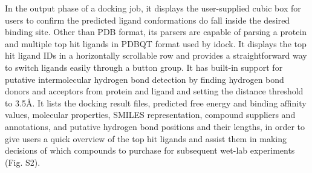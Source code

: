 \documentclass{bioinfo}
\begin{document}
\begin{methods}
In the output phase of a docking job, it displays the user-supplied cubic box for users to confirm the predicted ligand conformations do fall inside the desired binding site. Other than PDB format, its parsers are capable of parsing a protein and multiple top hit ligands in PDBQT format used by idock. It displays the top hit ligand IDs in a horizontally scrollable row and provides a straightforward way to switch ligands easily through a button group. It has built-in support for putative intermolecular hydrogen bond detection by finding hydrogen bond donors and acceptors from protein and ligand and setting the distance threshold to 3.5\AA. It lists the docking result files, predicted free energy and binding affinity values, molecular properties, SMILES representation, compound suppliers and annotations, and putative hydrogen bond positions and their lengths, in order to give users a quick overview of the top hit ligands and assist them in making decisions of which compounds to purchase for subsequent wet-lab experiments (Fig. S2).

\end{methods}


%
%
%
%
%
%


\end{document}

